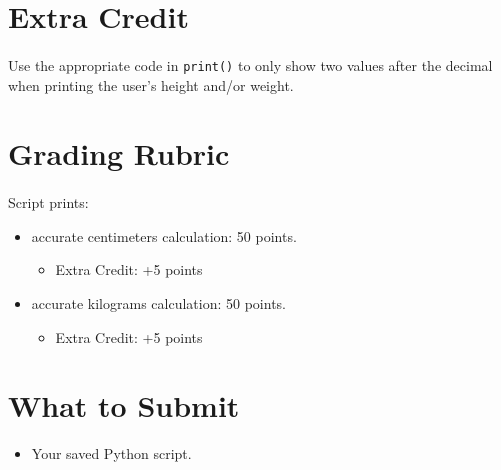 \documentclass[letter,10pt]{article}
\begin{document}
    \section*{Extra Credit}
    \paragraph{}Use the appropriate code in \texttt{print()} to only show two values after the decimal when printing the user's height and/or weight.
    
    \section*{Grading Rubric}
    \paragraph{}Script prints:
    \begin{itemize}
        \item accurate centimeters calculation: 50 points.
        \begin{itemize}
            \item Extra Credit: +5 points
        \end{itemize}
        \item accurate kilograms calculation: 50 points.
        \begin{itemize}
            \item Extra Credit: +5 points
        \end{itemize}
    \end{itemize}
    
    \section*{What to Submit}
    \begin{itemize}
        \item Your saved Python script.
    \end{itemize}
    
\end{document}
